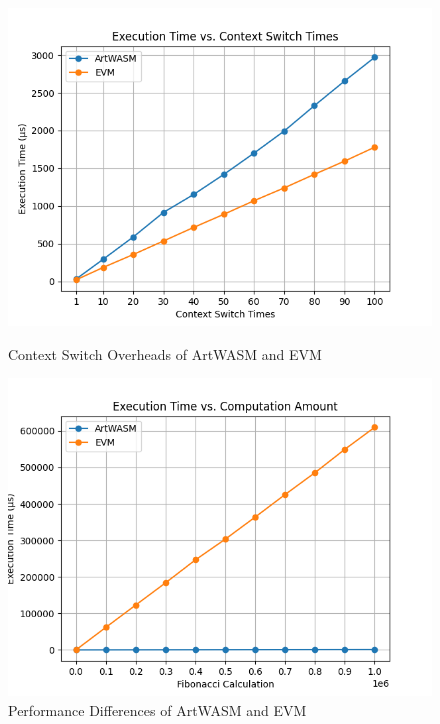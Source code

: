 \begin{figure}[htp]
  \centering
  \begin{minipage}{0.3\textwidth}
    \centering
    \includegraphics[width=1\linewidth]{sections/et-vs-cst.png}
    \caption{Context Switch Overheads of ArtWASM and EVM}
    \label{fig:image1}
  \end{minipage}\hfill
  \begin{minipage}{0.3\textwidth}
    \centering
    \includegraphics[width=1\linewidth]{sections/et-vs-ca.png}
    \caption{Performance Differences of ArtWASM and EVM}
    \label{fig:image2}
  \end{minipage}\hfill
  \begin{minipage}{0.3\textwidth}

\end{minipage}
\end{figure}
